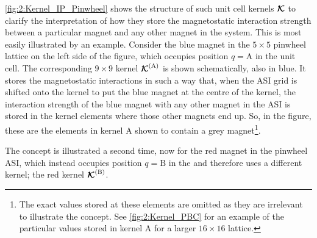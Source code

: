 
\cref{fig:2:Kernel_IP_Pinwheel} shows the structure of such unit cell kernels $\boldsymbol{\mathbf{\mathcal{K}}}$ to clarify the interpretation of how they store the magnetostatic interaction strength between a particular magnet and any other magnet in the system.
This is most easily illustrated by an example.
Consider the blue magnet in the $5 \times 5$ pinwheel lattice on the left side of the figure, which occupies position $q=\mathrm{A}$ in the unit cell.
The corresponding $9 \times 9$ kernel $\boldsymbol{\mathbf{\mathcal{K}}}^\mathrm{(A)}$ is shown schematically, also in blue.
It stores the magnetostatic interactions in such a way that, when the ASI grid is shifted onto the kernel to put the blue magnet at the centre of the kernel, the interaction strength of the blue magnet with any other magnet in the ASI is stored in the kernel elements where those other magnets end up.
So, in the figure, these are the elements in kernel A shown to contain a grey magnet\footnote{
	The exact values stored at these elements are omitted as they are irrelevant to illustrate the concept. See \cref{fig:2:Kernel_PBC} for an example of the particular values stored in kernel A for a larger $16 \times 16$ lattice.
}. \par
The concept is illustrated a second time, now for the red magnet in the pinwheel ASI, which instead occupies position $q=\mathrm{B}$ in the  and therefore uses a different kernel; the red kernel $\boldsymbol{\mathbf{\mathcal{K}}}^\mathrm{(B)}$. \\\par


